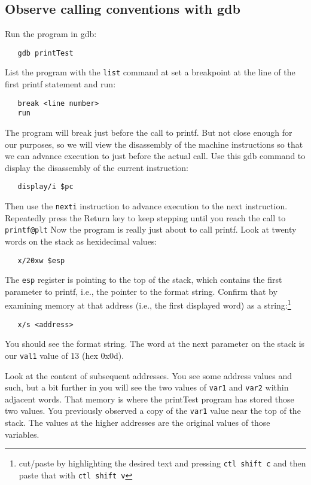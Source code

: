 \subsection{Observe calling conventions with gdb}
Run the  program in gdb:
\begin{verbatim}
   gdb printTest
\end{verbatim}
\noindent List the program with the {\tt list} command at set a breakpoint at the line of 
the first printf statement and run:
\begin{verbatim}
   break <line number>
   run
\end{verbatim}
\noindent The program will break just before the call to printf.  But not close enough for our
purposes, so we will view the disassembly of the machine instructions so that we can advance
execution to just before the actual call.  Use this gdb command to display the disassembly of
the current instruction:
\begin{verbatim}
   display/i $pc
\end{verbatim}
\noindent Then use the {\tt nexti} instruction to advance execution to the next instruction.
Repeatedly press the Return key to keep stepping until you reach the call to {\tt printf@plt}
Now the program is really just about to call printf.  Look at twenty words on the stack
as hexidecimal values:
\begin{verbatim}
   x/20xw $esp
\end{verbatim}
The {\tt esp} register is pointing to the top of the stack, which contains the first parameter
to printf, i.e., the pointer to the
format string.  Confirm that by examining memory at that address (i.e., the first displayed word)
as a string:\footnote{cut/paste by highlighting the desired text and pressing {\tt ctl shift c}
and then paste that with {\tt ctl shift v}}
\begin{verbatim}
   x/s <address>
\end{verbatim}
\noindent You should see the format string.  The word at the next parameter on the stack is our {\tt val1} value of
13 (hex 0x0d).

Look at the content of subsequent addresses.  You see some address values and such, but a bit further in
you will see the two values of {\tt var1} and {\tt var2} within adjacent words.  That memory is where the printTest
program has stored those two values.  You previously observed a copy of the {\tt var1} value near the top
of the stack.  The values at the higher addresses are the original values of those variables.

